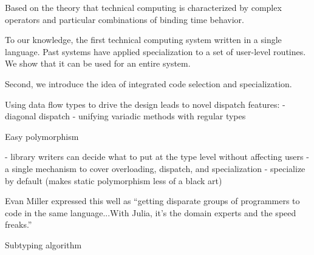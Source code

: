 Based on the theory that technical computing is characterized by complex
operators and particular combinations of binding time behavior.


To our knowledge, the first technical computing system written in a single language.
Past systems have applied specialization to a set of user-level routines.
We show that it can be used for an entire system.



Second, we introduce the idea of integrated code selection and specialization.

Using data flow types to drive the design leads to novel dispatch features:
- diagonal dispatch
- unifying variadic methods with regular types






Easy polymorphism

- library writers can decide what to put at the type level without affecting users
- a single mechanism to cover overloading, dispatch, and specialization
- specialize by default (makes static polymorphism less of a black art)

Evan Miller expressed this well as ``getting disparate groups of
programmers to code in the same language...With Julia, it's the domain experts
and the speed freaks.'' \cite{evanmiller}



Subtyping algorithm


